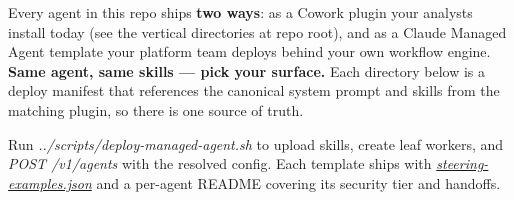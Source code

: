 \documentclass[11pt]{article}
\begin{document}
Every agent in this repo ships \textbf{two ways}: as a Cowork plugin your analysts install today (see the vertical directories at repo root), and as a Claude Managed Agent template your platform team deploys behind your own workflow engine. \textbf{Same agent, same skills — pick your surface.} Each directory below is a deploy manifest that references the canonical system prompt and skills from the matching plugin, so there is one source of truth.


Run \emph{../scripts/deploy-managed-agent.sh } to upload skills, create leaf workers, and \emph{POST /v1/agents} with the resolved config. Each template ships with \href{./pitch-agent/steering-examples.json}{\emph{steering-examples.json}} and a per-agent README covering its security tier and handoffs.


\begingroup
\small
\setlength{\tabcolsep}{2pt}
\end{document}
